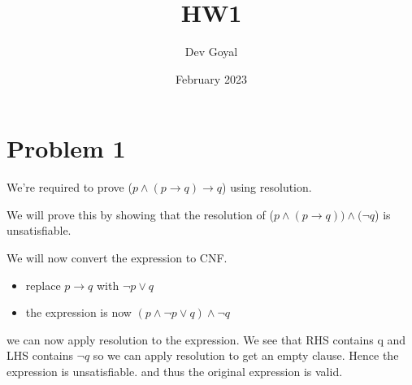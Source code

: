 \documentclass{article}
\title{HW1}
\author{Dev Goyal }
\date{February 2023}
\begin{document}
\maketitle

\section{Problem 1}

We're required to prove ($p \land (p \rightarrow q) \rightarrow q$) using resolution.

We will prove this by showing that the resolution of ($p \land (p \rightarrow q)) \land (\neg q$) is unsatisfiable.

We will now convert the expression to CNF.

\begin{itemize}
    \item replace $p \rightarrow q $ with $\neg p \lor q$
    \item the expression is now $(p \land \neg p \lor q) \land \neg q$
\end{itemize}
we can now apply resolution to the expression. We see that RHS contains q and LHS contains $\neg q$ so we can apply resolution to get an empty clause. Hence the expression is unsatisfiable.
and thus the original expression is valid.
\end{document}

